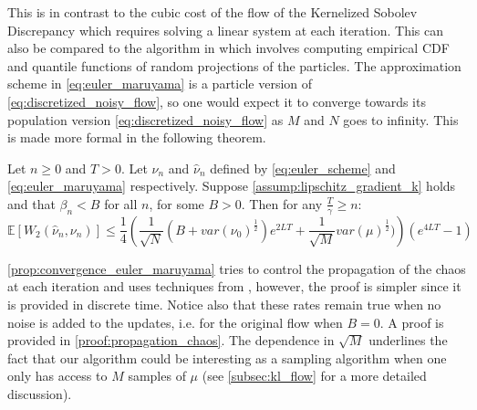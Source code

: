 This is in contrast to the cubic cost of the flow of the Kernelized Sobolev Discrepancy \cite{Mroueh:2019} which requires solving a linear system at each iteration. This can also be compared to the algorithm in  \cite{csimcsekli2018sliced} which involves computing empirical CDF and quantile functions of random projections of the particles.
The approximation scheme in \cref{eq:euler_maruyama} is a particle version of \cref{eq:discretized_noisy_flow}, so one would expect it to converge towards its population version  \cref{eq:discretized_noisy_flow} as $M$ and $N$ goes to infinity. This is made more formal in the following theorem.
\begin{theorem}\label{prop:convergence_euler_maruyama}
 Let $n\ge 0$ and $T>0$. Let $\nu_n$ and $\hat{\nu}_n$ defined by \eqref{eq:euler_scheme} and \eqref{eq:euler_maruyama} respectively. Suppose \cref{assump:lipschitz_gradient_k} holds and that $\beta_n<B$ for all $n$, for some $B>0$. Then for any $\frac{T}{\gamma}\geq n$:
\[
\mathbb{E}[W_{2}(\hat{\nu}_{n},\nu_{n})]\leq \frac{1}{4}\left(\frac{1}{\sqrt{N}}(B+var(\nu_{0})^{\frac{1}{2}})e^{2LT}+\frac{1}{\sqrt{M}}var(\mu)^{\frac{1}{2}})\right)(e^{4LT}-1)
\]
\end{theorem}
\cref{prop:convergence_euler_maruyama} tries to control the propagation of the chaos at each iteration and uses techniques from \cite{Jourdain:2007}, however, the proof is  simpler since it is provided in discrete time. Notice also that these rates remain true when no noise is added to the updates, i.e. for the original flow when $B=0$. A proof is provided in \cref{proof:propagation_chaos}. The dependence in $\sqrt{M}$ underlines the fact that our algorithm could be interesting as a sampling algorithm when one only has access to $M$ samples of $\mu$ (see \cref{subsec:kl_flow} for a more detailed discussion).

